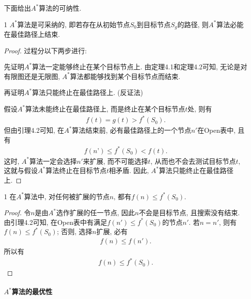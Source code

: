 下面给出$A^*$算法的可纳性.
\begin{mythm}{}{1}
    $A^*$算法是可采纳的, 即若存在从初始节点$S_0$到目标节点$S_g$的路径, 则$A^*$算法必能在最佳路径上结束.
\end{mythm}
\begin{proof}
过程分以下两步进行:

先证明$A^*$算法一定能够终止在某个目标节点上. 由定理4.1和定理4.2可知, 无论是对有限图还是无限图, $A^*$算法都能够找到某个目标节点而结束.

再证明$A^*$算法只能终止在最佳路径上. (反证法)

假设$A^*$算法未能终止在最佳路径上, 而是终止在某个目标节点$t$处, 则有
\begin{align}
    f(t)=g(t)>f^*(S_0).
\end{align}
但由引理4.2可知, 在$A^*$算法结束前, 必有最佳路径上的一个节点$n'$在Open表中, 且有
\begin{align}
    f(n’)\leq f^*(S_0)<f(t).
\end{align}
这时, $A^*$算法一定会选择$n'$来扩展, 而不可能选择$t$, 从而也不会去测试目标节点$t$, 这就与假设$A^*$算法终止在目标节点$t$相矛盾. 因此, $A^*$算法只能终止在最佳路径上.
\end{proof}

\begin{myprop}{}{1}
    在$A^*$算法中, 对任何被扩展的节点$n$, 都有$f(n)\leq f^*(S_0)$.
\end{myprop}
\begin{proof}
令$n$是由$A^*$选作扩展的任一节点, 因此$n$不会是目标节点, 且搜索没有结束. 由引理4.2可知, 在Open表中有满足$f(n')\leq f^*(S_0)$的节点$n'$.
若$n=n'$, 则有$f(n)\leq f^*(S_0)$; 否则, 选择$n$扩展, 必有
\begin{align}
    f(n) \leq f(n').
\end{align}
所以有
\begin{align}
    f(n)\leq f^*(S_0).
\end{align}
\end{proof}
\paragraph{$A^*$算法的最优性}~{}

